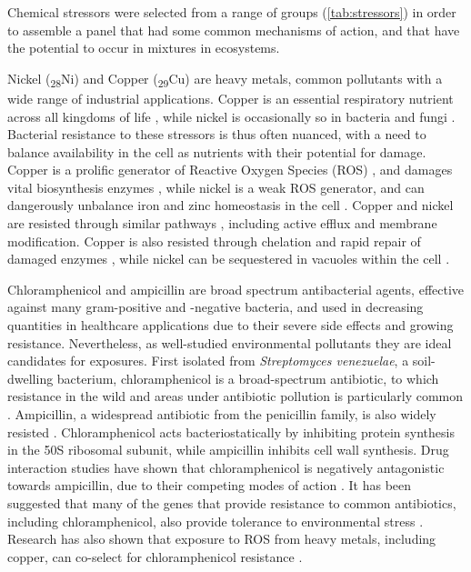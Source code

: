 \documentclass[final,1p,times]{elsarticle}
\begin{document}
Chemical stressors were selected from a range of groups (\cref{tab:stressors}) in order to assemble a panel that had some common mechanisms of action, and that have the potential to occur in mixtures in ecosystems.

Nickel (\textsubscript{28}Ni) and Copper (\textsubscript{29}Cu) are heavy metals, common pollutants with a wide range of industrial applications. Copper is an essential respiratory nutrient across all kingdoms of life \cite{Babcock1992}, while nickel is occasionally so in bacteria and fungi \cite{Zamble2015}. Bacterial resistance to these stressors is thus often nuanced, with a need to balance availability in the cell as nutrients with their potential for damage.  Copper is a prolific generator of Reactive Oxygen Species (ROS) \cite{Bal2002}, and damages vital biosynthesis enzymes \cite{Macomber2009}, while nickel is a weak ROS generator, and can dangerously unbalance iron and zinc homeostasis in the cell \cite{Samland2006}. Copper and nickel are resisted through similar pathways \cite{Mykytczuk2011CytoplasmicFerrooxidans}, including active efflux and membrane modification. Copper is also resisted through chelation and rapid repair of damaged enzymes \cite{Macomber2009}, while nickel can be sequestered in vacuoles within the cell \cite{Nishimura1998}.

Chloramphenicol and ampicillin are broad spectrum antibacterial agents, effective against many gram-positive and -negative bacteria, and used in decreasing quantities in healthcare applications due to their severe side effects and growing resistance. Nevertheless, as well-studied environmental pollutants they are ideal candidates for exposures. First isolated from \textit{Streptomyces venezuelae}, a soil-dwelling bacterium, chloramphenicol is a broad-spectrum antibiotic, to which resistance in the wild and areas under antibiotic pollution is particularly common \cite{Allen2010}. Ampicillin, a widespread antibiotic from the penicillin family, is also widely resisted \cite{Ruiz1999MechanismsFish}. Chloramphenicol acts bacteriostatically by inhibiting protein synthesis in the 50S ribosomal subunit, while ampicillin inhibits cell wall synthesis. Drug interaction studies have shown that chloramphenicol is negatively antagonistic towards ampicillin, due to their competing modes of action \cite{vanBambeke2017MechanismsAction}. It has been suggested that many of the genes that provide resistance to common antibiotics, including chloramphenicol, also provide tolerance to environmental stress \cite{Groh2007}. Research has also shown that exposure to ROS from heavy metals, including copper, can co-select for chloramphenicol resistance \cite{Harrison2009}.
\end{document}
